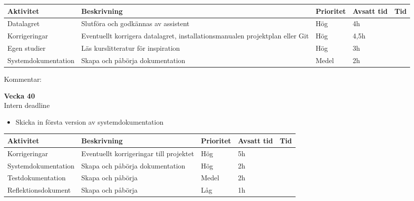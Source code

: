 \documentclass{mall}
\begin{document}
\begin{table}[h]
{\centering\begin{tabularx}{\textwidth}{|l|X|l|l|l|}
  \hline
Aktivitet            & Beskrivning                                                                                                              & Prioritet  & Avsatt tid & Tid \\  \hline
Datalagret           & Slutföra och godkännas av assistent                                                                                      & Hög   & 4h         &         \\  \hline
Korrigeringar        & Eventuellt korrigera datalagret, installationsmanualen projektplan eller Git  & Hög   & 4,5h       &     \\  \hline
Egen studier         & Läs kurslitteratur för inspiration                                                                                       & Hög   & 3h         &     \\  \hline
Systemdokumentation & Skapa och påbörja dokumentation                                                                                          & Medel & 2h         &    \\
 \hline
\end{tabularx}\par}
\end{table}

Kommentar:

\pagebreak

\hphantom{$\bullet$} \textbf{Vecka 40}\\

Intern deadline
\begin{itemize}
\color{blue}
    \item Skicka in första version av systemdokumentation
\end{itemize}

\begin{table}[h]
\begin{tabularx}{\textwidth}{|l|X|l|l|l|}
  \hline
Aktivitet            & Beskrivning                             & Prioritet  & Avsatt tid & Tid \\  \hline
Korrigeringar        & Eventuellt korrigeringar till projektet & Hög   & 5h         &     \\  \hline
Systemdokumentation & Skapa och påbörja dokumentation         & Hög   & 2h         &     \\  \hline
Testdokumentation    & Skapa och påbörja                       & Medel & 2h         &     \\  \hline
Reflektionsdokument  & Skapa och påbörja                       & Låg   & 1h         &   \\   \hline
\end{tabularx}
\end{table}
\end{document}
